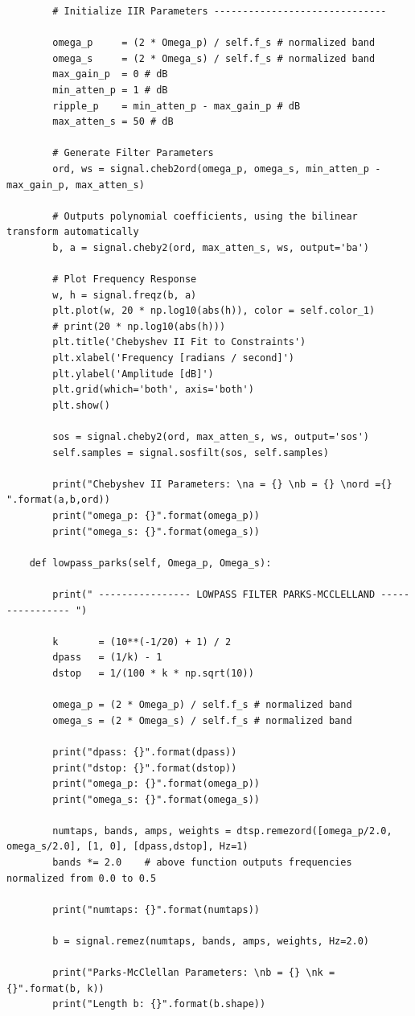 \documentclass{article}
\begin{document}
\begin{lstlisting}
		# Initialize IIR Parameters ------------------------------

		omega_p     = (2 * Omega_p) / self.f_s # normalized band
		omega_s     = (2 * Omega_s) / self.f_s # normalized band
		max_gain_p  = 0 # dB
		min_atten_p = 1 # dB
		ripple_p    = min_atten_p - max_gain_p # dB
		max_atten_s = 50 # dB

		# Generate Filter Parameters
		ord, ws = signal.cheb2ord(omega_p, omega_s, min_atten_p - max_gain_p, max_atten_s)

		# Outputs polynomial coefficients, using the bilinear transform automatically
		b, a = signal.cheby2(ord, max_atten_s, ws, output='ba')

		# Plot Frequency Response
		w, h = signal.freqz(b, a)
		plt.plot(w, 20 * np.log10(abs(h)), color = self.color_1)
		# print(20 * np.log10(abs(h)))
		plt.title('Chebyshev II Fit to Constraints')
		plt.xlabel('Frequency [radians / second]')
		plt.ylabel('Amplitude [dB]')
		plt.grid(which='both', axis='both')
		plt.show()

		sos = signal.cheby2(ord, max_atten_s, ws, output='sos')
		self.samples = signal.sosfilt(sos, self.samples)

		print("Chebyshev II Parameters: \na = {} \nb = {} \nord ={} ".format(a,b,ord))
		print("omega_p: {}".format(omega_p))
		print("omega_s: {}".format(omega_s))

	def lowpass_parks(self, Omega_p, Omega_s):

		print(" ---------------- LOWPASS FILTER PARKS-MCCLELLAND ---------------- ")

		k       = (10**(-1/20) + 1) / 2
		dpass   = (1/k) - 1
		dstop   = 1/(100 * k * np.sqrt(10))

		omega_p = (2 * Omega_p) / self.f_s # normalized band
		omega_s = (2 * Omega_s) / self.f_s # normalized band

		print("dpass: {}".format(dpass))
		print("dstop: {}".format(dstop))
		print("omega_p: {}".format(omega_p))
		print("omega_s: {}".format(omega_s))

		numtaps, bands, amps, weights = dtsp.remezord([omega_p/2.0, omega_s/2.0], [1, 0], [dpass,dstop], Hz=1)
		bands *= 2.0    # above function outputs frequencies normalized from 0.0 to 0.5

		print("numtaps: {}".format(numtaps))

		b = signal.remez(numtaps, bands, amps, weights, Hz=2.0)
		
		print("Parks-McClellan Parameters: \nb = {} \nk = {}".format(b, k))
		print("Length b: {}".format(b.shape))


\end{lstlisting}
\end{document}
